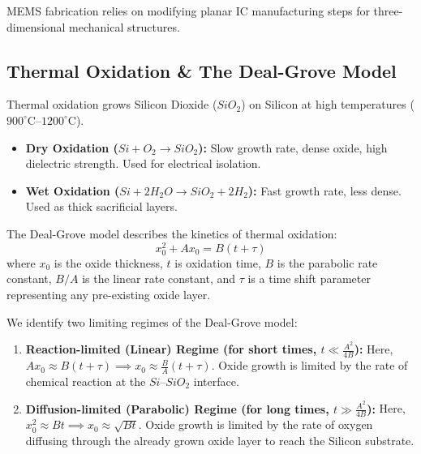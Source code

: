 \documentclass[12pt,a4paper]{article}
\begin{document}
MEMS fabrication relies on modifying planar IC manufacturing steps for three-dimensional mechanical structures.

\subsection{Thermal Oxidation \& The Deal-Grove Model}
Thermal oxidation grows Silicon Dioxide ($SiO_2$) on Silicon at high temperatures ($900^{\circ}\text{C}$--$1200^{\circ}\text{C}$).
\begin{itemize}[leftmargin=*, itemsep=3.5pt]
  \item \textbf{Dry Oxidation ($Si + O_2 \to SiO_2$):} Slow growth rate, dense oxide, high dielectric strength. Used for electrical isolation.
  \item \textbf{Wet Oxidation ($Si + 2H_2O \to SiO_2 + 2H_2$):} Fast growth rate, less dense. Used as thick sacrificial layers.
\end{itemize}

\begin{tcolorbox}[defbox, title={The Deal-Grove Model}]
The Deal-Grove model describes the kinetics of thermal oxidation:
$$x_0^2 + A x_0 = B(t + \tau)$$
where $x_0$ is the oxide thickness, $t$ is oxidation time, $B$ is the parabolic rate constant, $B/A$ is the linear rate constant, and $\tau$ is a time shift parameter representing any pre-existing oxide layer.
\end{tcolorbox}

We identify two limiting regimes of the Deal-Grove model:
\begin{enumerate}[leftmargin=*, label=\arabic*., itemsep=3.5pt]
  \item \textbf{Reaction-limited (Linear) Regime (for short times, $t \ll \frac{A^2}{4B}$):}
  Here, $A x_0 \approx B(t + \tau) \implies x_0 \approx \frac{B}{A}(t + \tau)$.
  Oxide growth is limited by the rate of chemical reaction at the $Si$--$SiO_2$ interface.
  \item \textbf{Diffusion-limited (Parabolic) Regime (for long times, $t \gg \frac{A^2}{4B}$):}
  Here, $x_0^2 \approx B t \implies x_0 \approx \sqrt{B t}$.
  Oxide growth is limited by the rate of oxygen diffusing through the already grown oxide layer to reach the Silicon substrate.
\end{enumerate}
\end{document}
